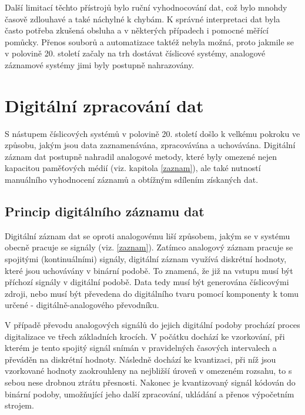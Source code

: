 Další limitací těchto přístrojů bylo ruční vyhodnocování dat, což bylo mnohdy časově zdlouhavé a také náchylné k chybám. K správné interpretaci dat byla často potřeba zkušená obsluha a v některých případech i pomocné měřící pomůcky. Přenos souborů a automatizace taktéž nebyla možná, proto jakmile se v polovině 20. století začaly na trh dostávat číslicové systémy, analogové záznamové systémy jimi byly postupně nahrazovány. \cite{newcastle_history_of_digital_computers, florian_prechod_a_analog_do_digital}


\section{Digitální zpracování dat}
\label{digitalni_zaznam_dat}
S nástupem číslicových systémů v polovině 20. století došlo k velkému pokroku ve způsobu, jakým jsou data zaznamenávána, zpracovávána a uchovávána. Digitální záznam dat postupně nahradil analogové metody, které byly omezené nejen kapacitou paměťových médií (viz. kapitola \ref{zaznam}), ale také nutností manuálního vyhodnocení záznamů a obtížným sdílením získaných dat.

\subsection{Princip digitálního záznamu dat}
Digitální záznam dat se oproti analogovému liší způsobem, jakým se v systému obecně pracuje se signály (viz. \ref{zaznam}). Zatímco analogový záznam pracuje se spojitými (kontinuálními) signály, digitální záznam využívá diskrétní hodnoty, které jsou uchovávány v binární podobě. To znamená, že již na vstupu musí být příchozí signály v digitální podobě. Data tedy musí být generována číslicovými zdroji, nebo musí být převedena do digitálního tvaru pomocí komponenty k tomu určené - digitálně-analogového převodníku. 

V případě převodu analogových signálů do jejich digitální podoby prochází proces digitalizace ve třech základních krocích. V počátku dochází ke vzorkování, při kterém je tento spojitý signál snímán v pravidelných časových intervalech a převáděn na diskrétní hodnoty. Následně dochází ke kvantizaci, při níž jsou vzorkované hodnoty zaokrouhleny na nejbližší úroveň v omezeném rozsahu, to s sebou nese drobnou ztrátu přesnosti. Nakonec je kvantizovaný signál kódován do binární podoby, umožňující jeho další zpracování, ukládání a přenos výpočetním strojem.


